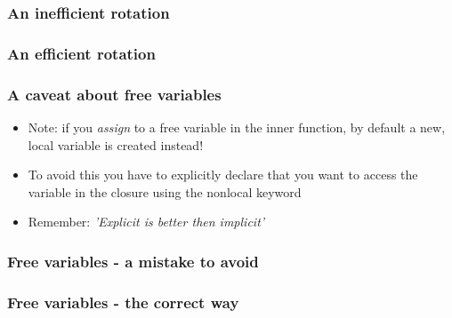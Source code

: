 \documentclass[9pt]{beamer}
\begin{document}
\begin{frame}
  \frametitle{An inefficient rotation}
  
\end{frame}


\begin{frame}
  \frametitle{An efficient rotation}
  
\end{frame}



\begin{frame}
  \frametitle{A caveat about free variables}
  \begin{itemize}  
    \item Note: if you \emph{assign} to a free variable in the inner function, 
          by default a new, local variable is created instead!
    \medskip
    \item To avoid this you have to explicitly declare that you want to access the variable in
          the closure using the \alert{nonlocal} keyword
    \medskip
    \item Remember: \emph{'Explicit is better then implicit'}
  \end{itemize}
\end{frame}



\begin{frame}
  \frametitle{Free variables - a mistake to avoid}
  
\end{frame}


\begin{frame}
  \frametitle{Free variables - the correct way}
  
\end{frame}
\end{document}
